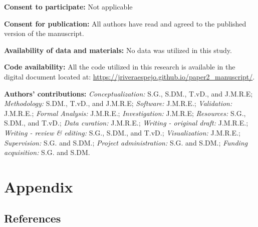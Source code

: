 \documentclass[
  authoryear,
  preprint,
  1p]{elsarticle}
\begin{document}
\textbf{Consent to participate:} Not applicable

\textbf{Consent for publication:} All authors have read and agreed to
the published version of the manuscript.

\textbf{Availability of data and materials:} No data was utilized in
this study.

\textbf{Code availability:} All the code utilized in this research is
available in the digital document located at:
\url{https://jriveraespejo.github.io/paper2_manuscript/}.

\textbf{Authors' contributions:} \emph{Conceptualization:} S.G., S.DM.,
T.vD., and J.M.R.E; \emph{Methodology:} S.DM., T.vD., and J.M.R.E;
\emph{Software:} J.M.R.E.; \emph{Validation:} J.M.R.E.; \emph{Formal
Analysis:} J.M.R.E.; \emph{Investigation:} J.M.R.E; \emph{Resources:}
S.G., S.DM., and T.vD.; \emph{Data curation:} J.M.R.E.; \emph{Writing -
original draft:} J.M.R.E.; \emph{Writing - review \& editing:} S.G.,
S.DM., and T.vD.; \emph{Visualization:} J.M.R.E.; \emph{Supervision:}
S.G. and S.DM.; \emph{Project administration:} S.G. and S.DM.;
\emph{Funding acquisition:} S.G. and S.DM.

\newpage{}

\section{Appendix}\label{sec-appendix}

\newpage{}

\subsection*{References}\label{references}

\renewcommand{\bibsection}{}

\end{document}

